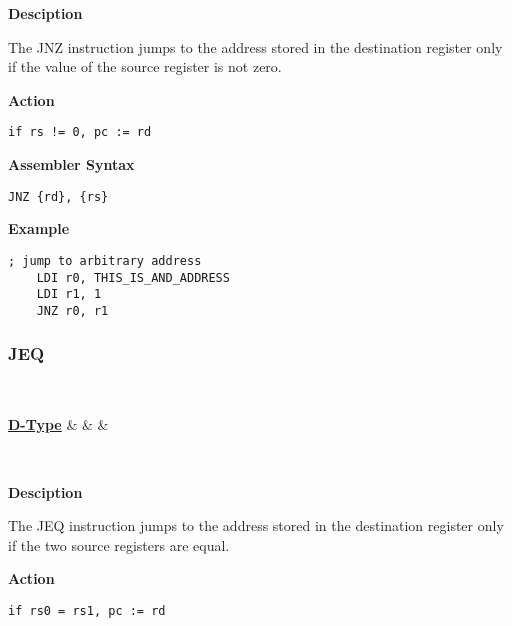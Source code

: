 \textbf{Desciption}

The JNZ instruction jumps to the address stored in the destination register only if the value of the source register is not zero.

\vspace{3ex}

\textbf{Action}
\begin{lstlisting}[frame=single]
	if rs != 0, pc := rd
\end{lstlisting}

\vspace{3ex}

\textbf{Assembler Syntax}
\begin{lstlisting}[frame=single]
	JNZ {rd}, {rs}
\end{lstlisting}

\vspace{3ex}

\textbf{Example}
\begin{lstlisting}[frame=single]
	; jump to arbitrary address
	LDI r0, THIS_IS_AND_ADDRESS
	LDI r1, 1
	JNZ r0, r1
\end{lstlisting}

\subsubsection{JEQ }\label{sec:JEQ}

\vspace{3ex}

\begin{center}
	\begin{bytefield}[leftcurly=., leftcurlyspace=0pt]{32}
		 \\
		\begin{leftwordgroup}{\hyperref[sec:r-type]{\textbf{D-Type}}}
		 & 
		 &
		 &
		\end{leftwordgroup}\\
	\end{bytefield}
\end{center}

\textbf{Desciption}

The JEQ instruction jumps to the address stored in the destination register only if the two source registers are equal.

\vspace{3ex}

\textbf{Action}
\begin{lstlisting}[frame=single]
	if rs0 = rs1, pc := rd
\end{lstlisting}

